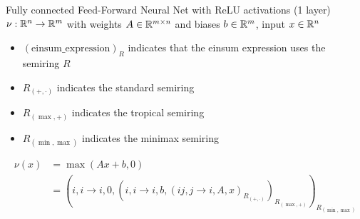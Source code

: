 Fully connected Feed-Forward Neural Net with ReLU activations (1 layer) $\nu: \mathbb{R}^n \rightarrow \mathbb{R}^m$ with weights $A \in \mathbb{R}^{m \times n}$ and biases $b \in \mathbb{R}^m$, input $x \in \mathbb{R}^n$
\begin{itemize}[noitemsep]
    \item $(\text{einsum\_expression})_{R}$ indicates that the einsum expression uses the semiring $R$
    \item $R_{(+, \cdot)}$ indicates the standard semiring
    \item $R_{(\max, +)}$ indicates the tropical semiring
    \item $R_{(\min, \max)}$ indicates the minimax semiring
\end{itemize}
\begin{align*}
    \nu(x) & = \max(Ax + b, 0)                                                                                                                  \\
           & = (i,i\rightarrow i, 0, (i,i \rightarrow i, b, (ij, j \rightarrow i, A, x)_{R_{(+, \cdot)}} )_{R_{(\max, +)}} )_{R_{(\min, \max)}}
\end{align*}

